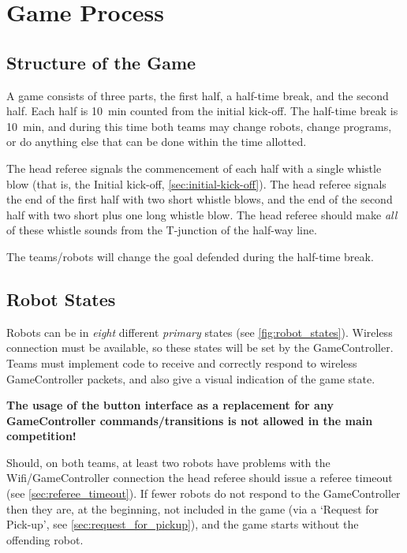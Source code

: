 \section{Game Process}
\label{sec:game_process}

\subsection{Structure of the Game}
\label{sec:game_struct}

A game consists of three parts, the first half, a half-time break, and the second half. Each half is \qty{10}{\minute} counted from the initial kick-off.
The half-time break is \qty{10}{\minute}, and during this time both teams may change robots, change programs, or do anything else that can be done within the time allotted.

The head referee signals the commencement of each half with a single whistle blow (that is, the Initial kick-off, \cf \cref{sec:initial-kick-off}).
The head referee signals the end of the first half with two short whistle blows, and the end of the second half with two short plus one long whistle blow.
The head referee should make \textit{all} of these whistle sounds from the T-junction of the half-way line.

The teams/robots will change the goal defended during the half-time break.

\subsection{Robot States}
\label{sec:robot_states}

Robots can be in \textit{eight} different \emph{primary} states (see \cref{fig:robot_states}). Wireless connection must be available, so these states will be set by the GameController. Teams must implement code to receive and correctly respond to wireless GameController packets, and also give a visual indication of the game state.

\textbf{The usage of the button interface as a replacement for any GameController commands/transitions is not allowed in the main competition!}

Should, on both teams, at least two robots have problems with the Wifi/GameController connection the head referee should issue a referee timeout (see \cref{sec:referee_timeout}).
If fewer robots do not respond to the GameController then they are, at the beginning, not included in the game (via a `Request for Pick-up', see \cref{sec:request_for_pickup}), and the game starts without the offending robot.


